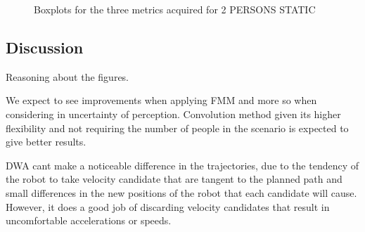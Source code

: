 \begin{figure}[t!]
\hspace{0.1cm}
%

\caption{Boxplots for the three metrics acquired for 2 PERSONS STATIC}
\label{fig:boxplots_2people}
\end{figure}


\subsection{Discussion}
\label{sec:discussion}

Reasoning about the figures.

We expect to see improvements when applying FMM and more so when considering in uncertainty of perception. Convolution method given its higher flexibility and not requiring the number of people in the scenario is expected to give better results.

DWA cant make a noticeable difference in the trajectories, due to the tendency of the robot to take velocity candidate that are tangent to the planned path and small differences in the new positions of the robot that each candidate will cause. However, it does a good job of discarding velocity candidates that result in uncomfortable accelerations or speeds.